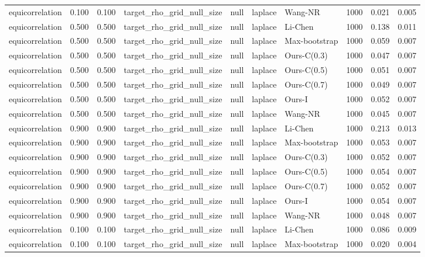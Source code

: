 \begin{tabular}{lrrllllrrr}
equicorrelation & 0.100 & 0.100 & target\_rho\_grid\_null\_size & null & laplace & Wang-NR & 1000 & 0.021 & 0.005 \\
equicorrelation & 0.500 & 0.500 & target\_rho\_grid\_null\_size & null & laplace & Li-Chen & 1000 & 0.138 & 0.011 \\
equicorrelation & 0.500 & 0.500 & target\_rho\_grid\_null\_size & null & laplace & Max-bootstrap & 1000 & 0.059 & 0.007 \\
equicorrelation & 0.500 & 0.500 & target\_rho\_grid\_null\_size & null & laplace & Ours-C(0.3) & 1000 & 0.047 & 0.007 \\
equicorrelation & 0.500 & 0.500 & target\_rho\_grid\_null\_size & null & laplace & Ours-C(0.5) & 1000 & 0.051 & 0.007 \\
equicorrelation & 0.500 & 0.500 & target\_rho\_grid\_null\_size & null & laplace & Ours-C(0.7) & 1000 & 0.049 & 0.007 \\
equicorrelation & 0.500 & 0.500 & target\_rho\_grid\_null\_size & null & laplace & Ours-I & 1000 & 0.052 & 0.007 \\
equicorrelation & 0.500 & 0.500 & target\_rho\_grid\_null\_size & null & laplace & Wang-NR & 1000 & 0.045 & 0.007 \\
equicorrelation & 0.900 & 0.900 & target\_rho\_grid\_null\_size & null & laplace & Li-Chen & 1000 & 0.213 & 0.013 \\
equicorrelation & 0.900 & 0.900 & target\_rho\_grid\_null\_size & null & laplace & Max-bootstrap & 1000 & 0.053 & 0.007 \\
equicorrelation & 0.900 & 0.900 & target\_rho\_grid\_null\_size & null & laplace & Ours-C(0.3) & 1000 & 0.052 & 0.007 \\
equicorrelation & 0.900 & 0.900 & target\_rho\_grid\_null\_size & null & laplace & Ours-C(0.5) & 1000 & 0.054 & 0.007 \\
equicorrelation & 0.900 & 0.900 & target\_rho\_grid\_null\_size & null & laplace & Ours-C(0.7) & 1000 & 0.052 & 0.007 \\
equicorrelation & 0.900 & 0.900 & target\_rho\_grid\_null\_size & null & laplace & Ours-I & 1000 & 0.054 & 0.007 \\
equicorrelation & 0.900 & 0.900 & target\_rho\_grid\_null\_size & null & laplace & Wang-NR & 1000 & 0.048 & 0.007 \\
equicorrelation & 0.100 & 0.100 & target\_rho\_grid\_null\_size & null & laplace & Li-Chen & 1000 & 0.086 & 0.009 \\
equicorrelation & 0.100 & 0.100 & target\_rho\_grid\_null\_size & null & laplace & Max-bootstrap & 1000 & 0.020 & 0.004 \\

\end{tabular}
